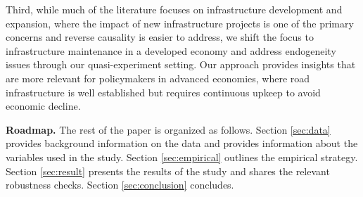 Third, while much of the literature focuses on infrastructure development and expansion, where the impact of new infrastructure projects is one of the primary concerns and reverse causality is easier to address, we shift the focus to infrastructure maintenance in a developed economy and address endogeneity issues through our quasi-experiment setting. Our approach provides insights that are more relevant for policymakers in advanced economies, where road infrastructure is well established but requires continuous upkeep to avoid economic decline.

{\bf Roadmap.} The rest of the paper is organized as follows. Section \ref{sec:data} provides background information on the data and provides information about the variables used in the study. Section \ref{sec:empirical} outlines the empirical strategy. Section \ref{sec:result} presents the results of the study and shares the relevant robustness checks. Section \ref{sec:conclusion} concludes.